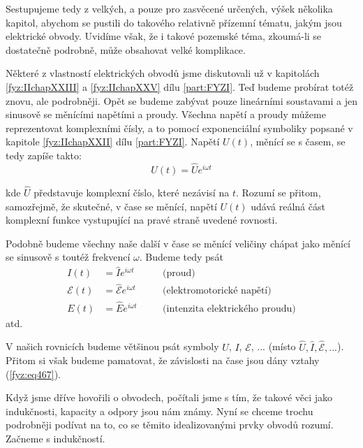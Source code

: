   Sestupujeme tedy z velkých, a pouze pro zasvěcené určených, výšek několika kapitol, abychom se 
  pustili do takového relativně přízemní tématu, jakým jsou elektrické obvody. Uvidíme však, že i 
  takové pozemské téma, zkoumá-li se dostatečně podrobně, může obsahovat velké komplikace.

  Některé z vlastností elektrických obvodů jsme diskutovali už v kapitolách \ref{fyz:IIchapXXIII} a 
  \ref{fyz:IIchapXXV} dílu \ref{part:FYZI}. Teď budeme probírat totéž znovu, ale podrobněji. Opět 
  se budeme zabývat pouze lineárními soustavami a jen sinusově se měnícími napětími a proudy. 
  Všechna napětí a proudy můžeme reprezentovat komplexními čísly, a to pomocí exponenciální 
  symboliky popsané v kapitole \ref{fyz:IIchapXXII} dílu \ref{part:FYZI}. Napětí \(U(t)\), 
  měnící se s časem, se tedy zapíše takto:
  \begin{equation}\label{fyz:eq466}
   U(t) = \hat{U}e^{i\omega t}
  \end{equation}
  
  kde \(\hat{U}\) představuje komplexní číslo, které nezávisí na \(t\). Rozumí se přitom, 
  samozřejmě, že skutečné, v čase se měnící, napětí \(U(t)\) udává reálná část komplexní funkce 
  vystupující na pravé straně uvedené rovnosti.
  
  Podobně budeme všechny naše další v čase se měnící veličiny chápat jako měnící se sinusově s 
  toutéž frekvencí \(\omega\). Budeme tedy psát
  \begin{subequations}\label{fyz:eq467}
  \begin{alignat}{3}
    I(t) &= \hat{I}e^{i\omega t} &&\quad\text{(proud)}                       \label{fyz:eq467a} \\
    \mathscr{E}(t) 
         &= \hat{\mathscr{E}}e^{i\omega t} 
                                 &&\quad\text{(elektromotorické napětí)}     \label{fyz:eq467b} \\ 
    E(t) &= \hat{E}e^{i\omega t} &&\quad\text{(intenzita elektrického proudu)} \label{fyz:eq467c}
  \end{alignat}
  \end{subequations}
  atd. 
  
  V našich rovnicích budeme většinou psát symboly \(U\), \(I\), \(\mathscr{E}\), ... (místo 
  \(\hat{U}, \hat{I}, \hat{\mathscr{E}}, ...\)). Přitom si však budeme pamatovat, že závislosti na 
  čase jsou dány vztahy (\ref{fyz:eq467}). 
  
  Když jsme dříve hovořili o obvodech, počítali jsme s tím, že takové věci jako indukčnosti, 
  kapacity a odpory jsou nám známy. Nyní se chceme trochu podrobněji podívat na to, co se těmito 
  idealizovanými prvky obvodů rozumí. Začneme s indukčností.

